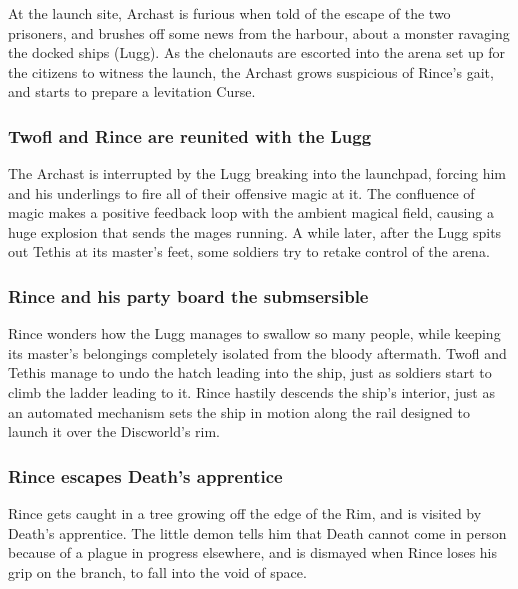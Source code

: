\subsubsection{}
At the launch site, \Gls{Archast} is furious when told of the escape of the two prisoners, and
brushes off some news from the harbour, about a monster ravaging the docked ships (\Gls{Lugg}).
As the chelonauts are escorted into the arena set up for the citizens to witness the launch,
the \Gls{Archast} grows suspicious of \Gls{Rince}'s gait, and starts to prepare a levitation
Curse.

\subsubsection{\Gls{Twofl} and \Gls{Rince} are reunited with the \Gls{Lugg}}
The \Gls{Archast} is interrupted by the \Gls{Lugg} breaking into the launchpad, forcing him and his
underlings to fire all of their offensive magic at it. The confluence of magic makes a positive
feedback loop with the ambient magical field, causing a huge explosion that sends the mages
running. A while later, after the \Gls{Lugg} spits out \Gls{Tethis} at its master's feet, some
soldiers try to retake control of the arena.

\subsubsection{\Gls{Rince} and his party board the submsersible}
\Gls{Rince} wonders how the \Gls{Lugg} manages to swallow so many people, while keeping its master's
belongings completely isolated from the bloody aftermath. \Gls{Twofl} and \Gls{Tethis} manage to
undo the hatch leading into the ship, just as soldiers start to climb the ladder leading to it.
\Gls{Rince} hastily descends the ship's interior, just as an automated mechanism sets the ship in
motion along the rail designed to launch it over the Discworld's rim.

\subsubsection{\Gls{Rince} escapes \Gls{Death}'s apprentice}
\Gls{Rince} gets caught in a tree growing off the edge of the Rim, and is visited by \Gls{Death}'s
apprentice. The little demon tells him that \Gls{Death} cannot come in person because of a plague
in progress elsewhere, and is dismayed when \Gls{Rince} loses his grip on the branch, to fall into
the void of space.


